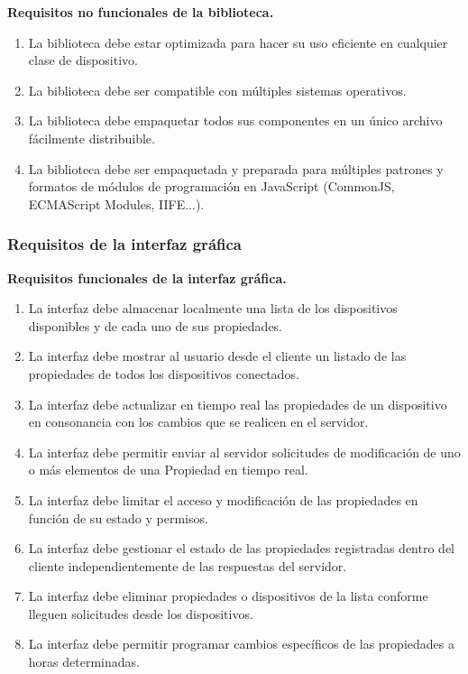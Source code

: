 \textbf{Requisitos no funcionales de la biblioteca.}

\begin{enumerate}[label=\textbf{R1.2.\arabic*.}, leftmargin=10mm]
  \item La biblioteca debe estar optimizada para hacer su uso eficiente en cualquier clase de dispositivo.
  \item La biblioteca debe ser compatible con múltiples sistemas operativos.
  \item La biblioteca debe empaquetar todos sus componentes en un único archivo fácilmente distribuible.
  \item La biblioteca debe ser empaquetada y preparada para múltiples patrones y formatos de módulos de programación en JavaScript (CommonJS, ECMAScript Modules, IIFE...).
\end{enumerate}


\subsubsection{Requisitos de la interfaz gráfica}  

\textbf{Requisitos funcionales de la interfaz gráfica.}

\begin{enumerate}[label=\textbf{R2.1.\arabic*.}, leftmargin=10mm]
  \item La interfaz debe almacenar localmente una lista de los dispositivos disponibles y de cada uno de sus propiedades.
  \item La interfaz debe mostrar al usuario desde el cliente un listado de las propiedades de todos los dispositivos conectados.
  \item La interfaz debe actualizar en tiempo real las propiedades de un dispositivo en consonancia con los cambios que se realicen en el servidor.
  \item La interfaz debe permitir enviar al servidor solicitudes de modificación de uno o más elementos de una Propiedad en tiempo real.
  \item La interfaz debe limitar el acceso y modificación de las propiedades en función de su estado y permisos.
  \item La interfaz debe gestionar el estado de las propiedades registradas dentro del cliente independientemente de las respuestas del servidor.
  \item La interfaz debe eliminar propiedades o dispositivos de la lista conforme lleguen solicitudes desde los dispositivos.
  \item La interfaz debe permitir programar cambios específicos de las propiedades a horas determinadas.
\end{enumerate}



